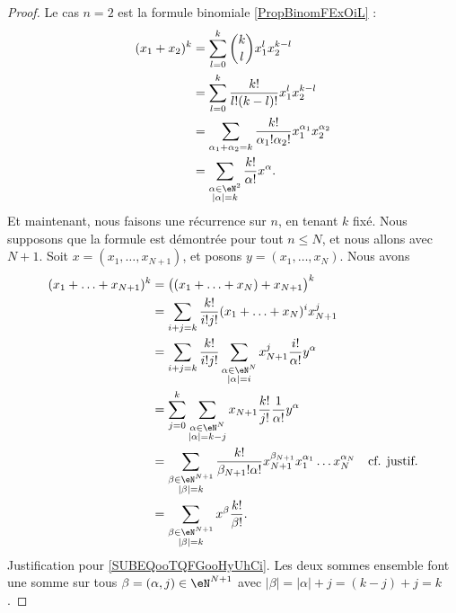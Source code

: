 \begin{proof}
	Le cas \( n=2\) est la formule binomiale \ref{PropBinomFExOiL} :
	\begin{subequations}
		\begin{align}
			(x_1+x_2)^k & = \sum_{l=0}^k\binom{ k }{ l }x_1^lx_2^{k-l}                                              \\
			            & = \sum_{l=0}^k\frac{ k! }{ l!(k-l)! }x_1^lx_2^{k-l}                                       \\
			            & = \sum_{\alpha_1+\alpha_2=k}\frac{ k! }{ \alpha_1!\alpha_2! }x_1^{\alpha_1}x_2^{\alpha_2} \\
			            & = \sum_{\substack{ \alpha\in \eN^2                                                        \\ | \alpha |=k }  }\frac{ k! }{ \alpha! }x^{\alpha}.
		\end{align}
	\end{subequations}
	Et maintenant, nous faisons une récurrence sur \( n\), en tenant \( k\) fixé. Nous supposons que la formule est démontrée pour tout \( n\leq N\), et nous allons avec \( N+1\). Soit \( x=(x_1,\ldots,x_{N+1})\), et posons \( y=(x_1,\ldots,x_N)\). Nous avons
	\begin{subequations}
		\begin{align}
			(x_1+\ldots+x_{N+1})^k & =\big( (x_1+\ldots+x_{N})+x_{N+1} \big)^k                        \\
			                       & =\sum_{i+j=k} \frac{ k! }{ i!j! } (x_1+\ldots+x_N)^ix_{N+1}^j    \\
			                       & =\sum_{i+j=k}\frac{ k! }{ i!j! }\sum_{\substack{ \alpha\in \eN^N \\ | \alpha |=i }  }x^{j}_{N+1}\frac{ i! }{ \alpha! }y^{\alpha}\\
			                       & = \sum_{j=0}^k\sum_{\substack{ \alpha\in \eN^N                   \\ | \alpha |=k-j }  }x_{N+1}\frac{ k! }{ j! }\frac{1}{ \alpha!}y^{\alpha}\\
			                       & = \sum_{\substack{ \beta\in \eN^{N+1}                            \\ | \beta |=k }  }  \frac{ k! }{ \beta_{N+1}!\alpha! }  x_{N+1}^{\beta_{N+1}}x_1^{\alpha_1}\ldots x_N^{\alpha_N}                                                           & \text{cf. justif.} \label{SUBEQooTQFGooHyUhCi}\\
			                       & = \sum_{\substack{ \beta\in \eN^{N+1}                            \\ | \beta |=k }  }x^{\beta}\frac{ k! }{ \beta! }.
		\end{align}
	\end{subequations}
	Justification pour \eqref{SUBEQooTQFGooHyUhCi}. Les deux sommes ensemble font une somme sur tous \( \beta=(\alpha,j)\in \eN^{N+1}\) avec \( | \beta |=| \alpha |+j=(k-j)+j=k\).
\end{proof}

